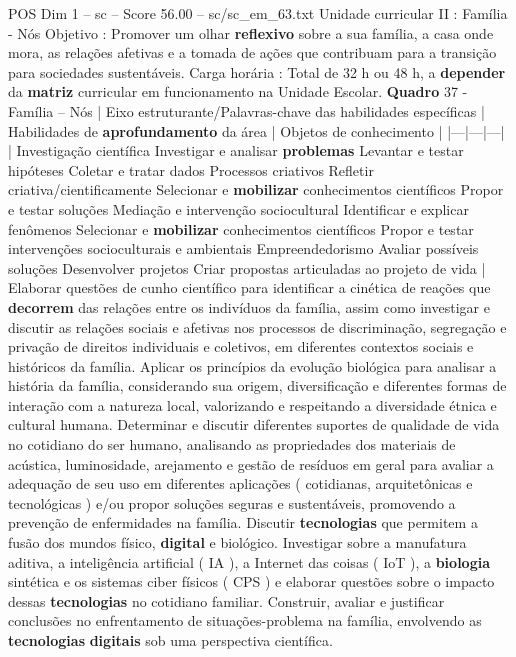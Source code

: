 \begin{textsample}{POS Dim 1 – sc – Score 56.00 – sc/sc\_em\_63.txt}
Unidade curricular II : Família - Nós Objetivo : Promover um olhar \textbf{reflexivo} sobre a sua família, a casa onde mora, as relações afetivas e a tomada de ações que contribuam para a transição para sociedades sustentáveis.
Carga horária : Total de 32 h ou 48 h, a \textbf{depender} da \textbf{matriz} curricular em funcionamento na Unidade Escolar. \textbf{Quadro} 37 - Família – Nós | Eixo estruturante/Palavras-chave das habilidades específicas | Habilidades de \textbf{aprofundamento} da área | Objetos de conhecimento | |---|---|---| | Investigação científica Investigar e analisar \textbf{problemas} Levantar e testar hipóteses Coletar e tratar dados Processos criativos Refletir criativa/cientificamente Selecionar e \textbf{mobilizar} conhecimentos científicos Propor e testar soluções Mediação e intervenção sociocultural Identificar e explicar fenômenos Selecionar e \textbf{mobilizar} conhecimentos científicos Propor e testar intervenções socioculturais e ambientais Empreendedorismo Avaliar possíveis soluções Desenvolver projetos Criar propostas articuladas ao projeto de vida | Elaborar questões de cunho científico para identificar a cinética de reações que \textbf{decorrem} das relações entre os indivíduos da família, assim como investigar e discutir as relações sociais e afetivas nos processos de discriminação, segregação e privação de direitos individuais e coletivos, em diferentes contextos sociais e históricos da família.
Aplicar os princípios da evolução biológica para analisar a história da família, considerando sua origem, diversificação e diferentes formas de interação com a natureza local, valorizando e respeitando a diversidade étnica e cultural humana.
Determinar e discutir diferentes suportes de qualidade de vida no cotidiano do ser humano, analisando as propriedades dos materiais de acústica, luminosidade, arejamento e gestão de resíduos em geral para avaliar a adequação de seu uso em diferentes aplicações ( cotidianas, arquitetônicas e tecnológicas ) e/ou propor soluções seguras e sustentáveis, promovendo a prevenção de enfermidades na família.
Discutir \textbf{tecnologias} que permitem a fusão dos mundos físico, \textbf{digital} e biológico.
Investigar sobre a manufatura aditiva, a inteligência artificial ( IA ), a Internet das coisas ( IoT ), a \textbf{biologia} sintética e os sistemas ciber físicos ( CPS ) e elaborar questões sobre o impacto dessas \textbf{tecnologias} no cotidiano familiar.
Construir, avaliar e justificar conclusões no enfrentamento de situações-problema na família, envolvendo as \textbf{tecnologias} \textbf{digitais} sob uma perspectiva científica.

\end{textsample}
